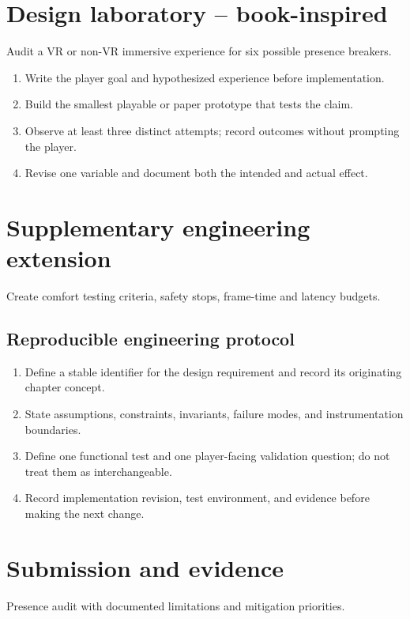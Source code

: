 \documentclass[11pt]{article}
\begin{document}
\section{Design laboratory -- book-inspired}
Audit a VR or non-VR immersive experience for six possible presence breakers.

\begin{enumerate}
\item Write the player goal and hypothesized experience before implementation.
\item Build the smallest playable or paper prototype that tests the claim.
\item Observe at least three distinct attempts; record outcomes without prompting the player.
\item Revise one variable and document both the intended and actual effect.
\end{enumerate}

\section{Supplementary engineering extension}
Create comfort testing criteria, safety stops, frame-time and latency budgets.


\subsection{Reproducible engineering protocol}
\begin{enumerate}
\item Define a stable identifier for the design requirement and record its originating chapter concept.
\item State assumptions, constraints, invariants, failure modes, and instrumentation boundaries.
\item Define one functional test and one player-facing validation question; do not treat them as interchangeable.
\item Record implementation revision, test environment, and evidence before making the next change.
\end{enumerate}

\section{Submission and evidence}
Presence audit with documented limitations and mitigation priorities.
\end{document}
